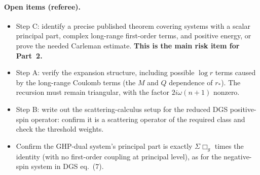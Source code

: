 \documentclass[11pt]{article}
\theoremstyle{remark}\newtheorem{remark}{Remark}
\begin{document}
\paragraph{Open items (referee).}
\begin{itemize}
\item[(R4)] Step C: identify a precise published theorem covering systems with a scalar principal part, complex long-range first-order terms, and positive energy, or prove the needed Carleman estimate. \textbf{This is the main risk item for Part~2.}
\item[(R5)] Step A: verify the expansion structure, including possible $\log r$ terms caused by the long-range Coulomb terms (the $M$ and $Q$ dependence of $r_*$). The recursion must remain triangular, with the factor $2i\omega(n+1)$ nonzero.
\item[(R6)] Step B: write out the scattering-calculus setup for the reduced DGS positive-spin operator: confirm it is a scattering operator of the required class and check the threshold weights.
\item[(R7)] Confirm the GHP-dual system's principal part is exactly $\Sigma\Box_g$ times the identity (with no first-order coupling at principal level), as for the negative-spin system in DGS eq.~(7).
\end{itemize}
\end{document}
